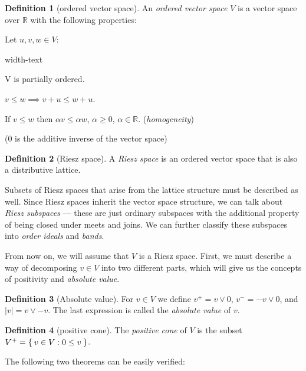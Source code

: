 \documentclass[letterpaper,10pt,oneside,onecolumn,reqno]{amsart}
\newcommand{\R}{\mathbb R}
\theoremstyle{definition}
\newtheorem{defn}{Definition}
\newcommand{\join}{\vee}
\begin{document}
  \begin{defn}[ordered vector space]\label{def:4}
    An \emph{ordered vector space} $V$ is
    a vector space over $\R$ with the following properties:


    Let $u,v,w \in V$:
    \begin{deflist}{width-text}
    \item V is partially ordered.
    \item $v \leq w \implies v + u \leq w + u$.
    \item If $v \leq w$ then $\alpha v \leq \alpha w$, $\alpha \geq
      0$, $\alpha \in \R$. (\emph{homogeneity})
    \end{deflist}

    ($0$ is the additive inverse of the vector space)
  \end{defn}

\begin{defn}[Riesz space]\label{def:5}
  A \emph{Riesz space} is an ordered vector space
  that is also a distributive lattice.
\end{defn}

Subsets of Riesz spaces that arise from the lattice structure must be
described as well. Since Riesz spaces inherit the vector space
structure, we can talk about \emph{Riesz subspaces} --- these are just
ordinary subspaces with the additional property of being closed under
meets and joins. We can further classify these subspaces into
\emph{order ideals} and \emph{bands}.

From now on, we will assume that $V$ is a Riesz space. First, we must
describe a way of decomposing $v \in V$ into two different parts,
which will give us the concepts of positivity and \emph{absolute
  value}.

  \begin{defn}[Absolute value]\label{def:6}
    For $v \in V$ we define $v^+=v \join 0$, $v^-=-v \join 0$, and
    $|v| = v \join -v$. The last expression is called the
    \emph{absolute value} of $v$.
  \end{defn}

  \begin{defn}[positive cone]\label{def:11}
    The \emph{positive cone} of $V$ is the subset
    $V^+ = \Set{v \in V : 0 \leq v}$.
  \end{defn}

  The following two theorems can be easily verified:
\end{document}
